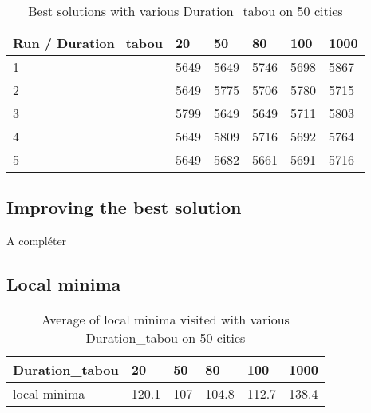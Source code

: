 \documentclass[12pt,oneside,a4paper]{article}
\begin{document}
  \begin{table}[h]
    \centering
    \small
    \begin{tabular}{llllll}
      \hline
      \multicolumn{1}{|l|}{\textbf{Run / Duration\_tabou}}& \multicolumn{1}{l|}{\textbf{20}} & \multicolumn{1}{l|}{\textbf{50}} & \multicolumn{1}{l|}{\textbf{80}} & \multicolumn{1}{l|}{\textbf{100}} & \multicolumn{1}{l|}{\textbf{1000}}\\ \hline
      \multicolumn{1}{|l|}{1} & \multicolumn{1}{l|}{5649}  & \multicolumn{1}{l|}{5649}  & \multicolumn{1}{l|}{5746}   & \multicolumn{1}{l|}{5698}  & \multicolumn{1}{l|}{5867} \\ \hline
      \multicolumn{1}{|l|}{2} & \multicolumn{1}{l|}{5649}  & \multicolumn{1}{l|}{5775}  & \multicolumn{1}{l|}{5706}  & \multicolumn{1}{l|}{5780}  & \multicolumn{1}{l|}{5715} \\ \hline         
      \multicolumn{1}{|l|}{3} & \multicolumn{1}{l|}{5799}  & \multicolumn{1}{l|}{5649}  & \multicolumn{1}{l|}{5649}  & \multicolumn{1}{l|}{5711}  & \multicolumn{1}{l|}{5803} \\ \hline
      \multicolumn{1}{|l|}{4} & \multicolumn{1}{l|}{5649}  & \multicolumn{1}{l|}{5809}  & \multicolumn{1}{l|}{5716}   & \multicolumn{1}{l|}{5692}  & \multicolumn{1}{l|}{5764}\\ \hline
      \multicolumn{1}{|l|}{5} & \multicolumn{1}{l|}{5649}  & \multicolumn{1}{l|}{5682}  & \multicolumn{1}{l|}{5661}   & \multicolumn{1}{l|}{5691}  & \multicolumn{1}{l|}{5716}\\ \hline
    \end{tabular}
    \caption{Best solutions with various Duration\_tabou on 50 cities}
    \label{Performances scénario 0}
  \end{table}

\subsection{Improving the best solution}
  A compléter
\subsection{Local minima}
\begin{table}[h]
    \centering
    \small
    \begin{tabular}{llllll}
      \hline
      \multicolumn{1}{|l|}{\textbf{Duration\_tabou}}& \multicolumn{1}{l|}{\textbf{20}} & \multicolumn{1}{l|}{\textbf{50}} & \multicolumn{1}{l|}{\textbf{80}} & \multicolumn{1}{l|}{\textbf{100}} & \multicolumn{1}{l|}{\textbf{1000}}\\ \hline
      \multicolumn{1}{|l|}{local minima } & \multicolumn{1}{l|}{120.1}  & \multicolumn{1}{l|}{107}  & \multicolumn{1}{l|}{104.8}   & \multicolumn{1}{l|}{112.7}  & \multicolumn{1}{l|}{138.4} \\ \hline
    \end{tabular}
    \caption{Average of local minima visited with various Duration\_tabou on 50 cities}
    \label{Performances scénario 0}
  \end{table}
\end{document}
